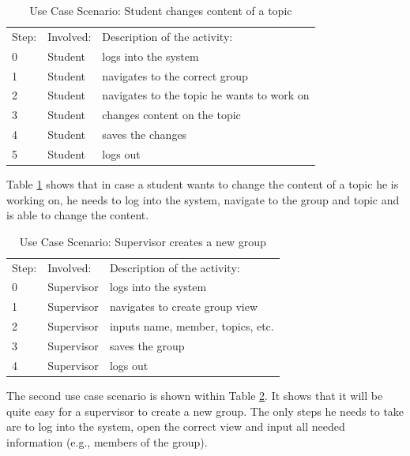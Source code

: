  \begin{table}[h]
\scriptsize
 \caption{Use Case Scenario: Student changes content of a topic}
 \begin{tabular}{lll}
	\toprule
  Step: & Involved: & Description of the activity: \\ 
\cmidrule(rl){1-1}\cmidrule(rl){2-2}\cmidrule(rl){3-3}
  	0 	& Student & logs into the system \\
	1	& Student & navigates to the correct group \\
	2	& Student & navigates to the topic he wants to work on \\
	3	& Student & changes content on the topic \\
	4	& Student & saves the changes \\	
	5	& Student & logs out \\
	\bottomrule
 \end{tabular}
 \label{tab:ucTopicChange}
 \end{table} 

Table \ref{tab:ucTopicChange} shows that in case a student wants to change the content of a topic he is working on, he needs to log into the system, navigate to the group and topic and is able to change the content.
 
 \begin{table}[h]
\scriptsize
 \caption{Use Case Scenario: Supervisor creates a new group}
 \begin{tabular}{lll}
	\toprule
  Step: & Involved: & Description of the activity: \\ 
\cmidrule(rl){1-1}\cmidrule(rl){2-2}\cmidrule(rl){3-3}
  	0 	& Supervisor & logs into the system \\
	1	& Supervisor & navigates to create group view \\
	2	& Supervisor & inputs name, member, topics, etc. \\
	3	& Supervisor & saves the group \\	
	4	& Supervisor & logs out \\
	\bottomrule
 \end{tabular}
 \label{tab:ucGroupCreation}
 \end{table} 

The second use case scenario is shown within Table \ref{tab:ucGroupCreation}. It shows that it will be quite easy for a supervisor to create a new group. The only steps he needs to take are to log into the system, open the correct view and input all needed information (e.g., members of the group). 

